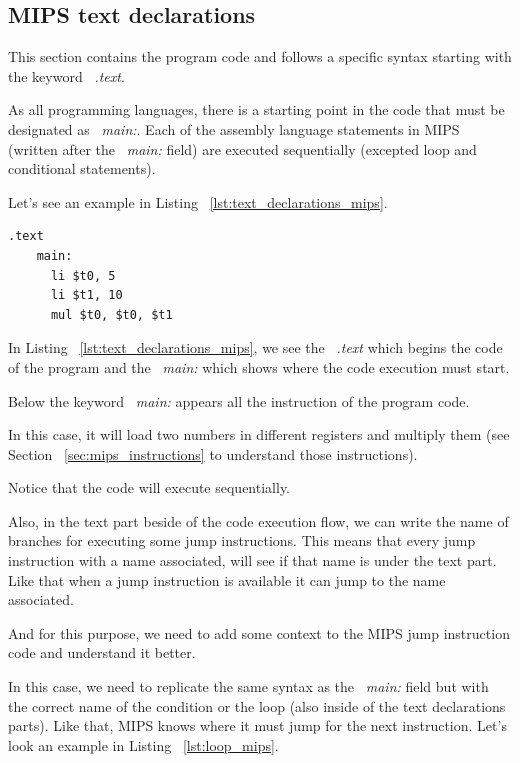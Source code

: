 \documentclass[
  oneside,
  11pt, a4paper,
  footinclude=true,
  headinclude=true,
  cleardoublepage=empty
]{scrbook}
\begin{document}
\subsection{MIPS text declarations}
This section contains the program code and follows a specific syntax starting with the keyword ~\textit{.text}.

As all programming languages, there is a starting point in the code that must be designated as ~\textit{main:}. Each of the assembly language statements in MIPS (written after the ~\textit{main:} field) are executed sequentially (excepted loop and conditional statements).

Let's see an example in Listing ~\ref{lst:text_declarations_mips}.

\begin{lstlisting}[caption={Example of Text declarations in MIPS},label={lst:text_declarations_mips}]
  .text 
    main:
      li $t0, 5
      li $t1, 10
      mul $t0, $t0, $t1
\end{lstlisting}

In Listing ~\ref{lst:text_declarations_mips}, we see the ~\textit{.text} which begins the code of the program and the ~\textit{main:} which shows where the code execution must start.

Below the keyword ~\textit{main:} appears all the instruction of the program code. 

In this case, it will load two numbers in different registers and multiply them (see Section ~\ref{sec:mips_instructions} to understand those instructions). 

Notice that the code will execute sequentially.

Also, in the text part beside of the code execution flow, we can write the name of branches for executing some jump instructions. This means that every jump instruction with a name associated, will see if that name is under the text part.
Like that when a jump instruction is available it can jump to the name associated.

And for this purpose, we need to add some context to the MIPS jump instruction code and understand it better.



In this case, we need to replicate the same syntax as the ~\textit{main:} field but with the correct name of the condition or the loop (also inside of the text declarations parts). Like that, MIPS knows where it must jump for the next instruction.
Let's look an example in Listing ~\ref{lst:loop_mips}.
\end{document}
